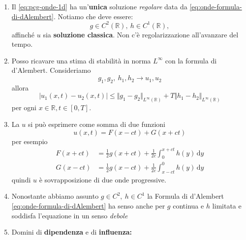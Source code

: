 \documentclass[10pt,a4paper,twoside,openright]{book}
\newcommand{\de}{\,\mathrm d}
\newcommand{\dy}{\de y}
\begin{document}
\begin{enumerate}
    \item Il \eqref{eq:pcg-onde-1d} ha un'\textbf{unica} soluzione \textit{regolare} data da \eqref{eq:onde-formula-di-dAlembert}. Notiamo che deve essere:
          \begin{equation*}
              g\in C^{2}(\mathbb{R}) ,\ h\in C^{1}(\mathbb{R}) ,
          \end{equation*}
          affinché $u$ sia\textbf{ soluzione classica}. Non c'è regolarizzazione all'avanzare del tempo.
    \item Posso ricavare una stima di stabilità in norma $\displaystyle L^{\infty }$ con la formula di d'Alembert. Consideriamo
          \begin{equation*}
              g_{1} ,g_{2} ,\ h_{1} ,h_{2}\rightarrow u_{1} ,u_{2}
          \end{equation*}
          allora
          \begin{equation*}
              | u_{1}(x,t) -u_{2}(x,t)| \leqslant \Vert g_{1} -g_{2}\Vert _{L^{\infty }(\mathbb{R})} +T\Vert h_{1} -h_{2}\Vert _{L^{\infty }(\mathbb{R})}
          \end{equation*}
          per ogni $x\in \mathbb{R}, t\in [0,T]$.
    \item La $u$ si può esprimere come somma di due funzioni
          \begin{equation*}
              u(x,t) =F(x-ct) +G(x+ct)
          \end{equation*}
          per esempio
          \begin{align*}
              F(x+ct) & =\frac{1}{2} g(x+ct) +\frac{1}{2c}\int _{0}^{x+ct} h(y) \dy \\
              G(x-ct) & =\frac{1}{2} g(x-ct) +\frac{1}{2c}\int _{x-ct}^{0} h(y) \dy
          \end{align*}
          quindi $u$ è sovrapposizione di due onde progressive.
    \item Nonostante abbiamo assunto $\displaystyle g\in C^{2} ,\ h\in C^{1}$ la Formula di d'Alembert \eqref{eq:onde-formula-di-dAlembert} ha senso anche per $g$ continua e $h$ limitata e soddisfa l'equazione in un senso \textit{debole}

    \item Domini di \textbf{dipendenza} e di \textbf{influenza:}



\end{enumerate}
\end{document}

